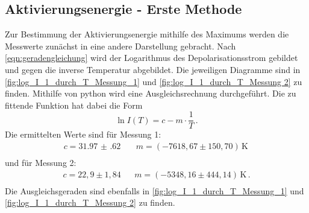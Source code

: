\subsection{Aktivierungsenergie - Erste Methode}
  Zur Bestimmung der Aktivierungsenergie mithilfe des Maximums werden die Messwerte zunächst in eine andere Darstellung gebracht.
  Nach \eqref{eqn:geradengleichung} wird der Logarithmus des Depolarisationsstrom gebildet und gegen die inverse Temperatur abgebildet.
  Die jeweiligen Diagramme sind in \autoref{fig:log_I_1_durch_T_Messung_1} und \autoref{fig:log_I_1_durch_T_Messung 2} zu finden.
  Mithilfe von python wird eine Ausgleichsrechnung durchgeführt.
  Die zu fittende Funktion hat dabei die Form
  \begin{equation*}
    \ln{I(T)} = c - m \cdot \frac{1}{T} \, .
  \end{equation*}
  Die ermittelten Werte sind für Messung 1:
  \begin{align*}
    c =  \SI{31.97(62)}{} && m = (-7618,67\pm 150,70)\,\si{\kelvin} \,  \\
  \end{align*}
  und für Messung 2:
  \begin{align*}
    c = 22,9\pm 1,84 && m = (-5348,16\pm 444,14)\,\si{\kelvin}  \, . \\
  \end{align*}
  Die Ausgleichsgeraden sind ebenfalls in \autoref{fig:log_I_1_durch_T_Messung_1} und \autoref{fig:log_I_1_durch_T_Messung 2} zu finden.

